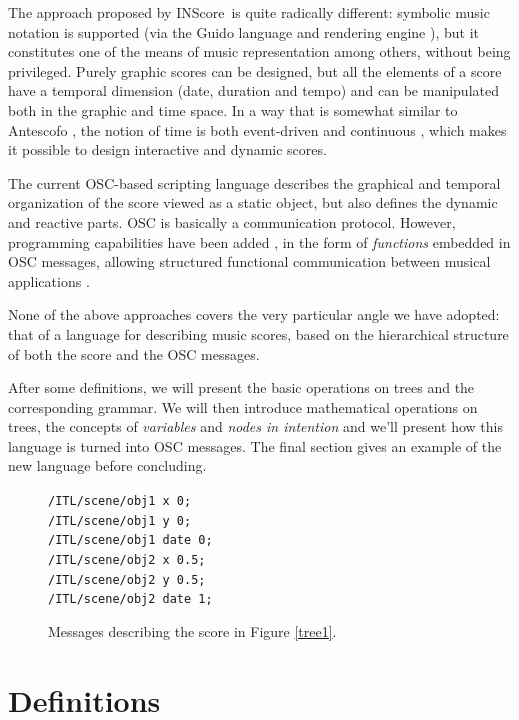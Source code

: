 \documentclass{article}
\newcommand{\IS}		{INScore}
\newcommand{\code}	[2][0.9]		{\vspace{0mm}\begin{center}\colorbox{mygrey}{
							\begin{minipage}[t]{#1\columnwidth} 
							{\small \texttt{#2}}
							\end{minipage}}\end{center}}
\begin{document}
The approach proposed by \IS\ is quite radically different: symbolic music notation is supported (via the Guido language and rendering engine \cite{Dau:09b,hoos98}), but it constitutes one of the means of music representation among others, without being privileged. 
Purely graphic scores can be designed, but all the elements of a score have a temporal dimension (date, duration and tempo) and can be manipulated both in the graphic and time space. In a way that is somewhat similar to Antescofo \cite{acont08}, the notion of time is both event-driven and continuous \cite{fober17c}, which makes it possible to design interactive and dynamic scores.

The current OSC-based scripting language describes the graphical and temporal organization of the score viewed as a static object, but also defines the dynamic and reactive parts.
OSC is basically a communication protocol. However, programming capabilities have been added \cite{429}, in the form of \emph{functions} embedded in OSC messages, allowing structured functional communication between musical applications \cite{bresson:hal-01353794}. 

None of the above approaches covers the very particular angle we have adopted: that of a language for describing music scores, based on the hierarchical structure of both the score and the OSC messages.

After some definitions, we will present the basic operations on trees and the corresponding grammar. We will then introduce mathematical operations on trees, the concepts of \emph{variables} and \emph{nodes in intention} and we'll present how this language is turned into OSC messages. The final section gives an example of the new language before concluding.

\begin{figure}
\code{/ITL/scene/obj1 x 0;\\
/ITL/scene/obj1 y    0;\\
/ITL/scene/obj1 date 0;\\
/ITL/scene/obj2 x    0.5;\\
/ITL/scene/obj2 y    0.5;\\
/ITL/scene/obj2 date 1;
}
\caption{Messages describing the score in Figure \ref{tree1}.}
\label{script1}
\end{figure}


\section{Definitions}
\end{document}
